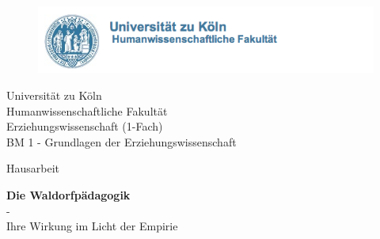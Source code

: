 \begin{titlepage}



\begin{figure}[!ht]
	\centering
		\includegraphics[natwidth=920pt, natheight=95pt, width=1.0\textwidth]{Bilder/LogoUni.png}


\end{figure}

\begin{center}

\vspace{0,8cm}

\begin{large}
Universität zu Köln\\
Humanwissenschaftliche Fakultät\\
Erziehungswissenschaft (1-Fach)\\
BM 1 - Grundlagen der Erziehungswissenschaft\\
\vspace{1,2cm}
\begin{scshape}
Hausarbeit\\ 
\end{scshape}
\end{large}


\vspace{1.2cm}

\begin{rmfamily}
\textbf{\huge Die Waldorfpädagogik}\\
\LARGE -\\
	Ihre Wirkung im Licht der Empirie\\
\normalsize
\end{rmfamily}

\vspace{1.7cm}
%


\end{center}
\end{titlepage}

